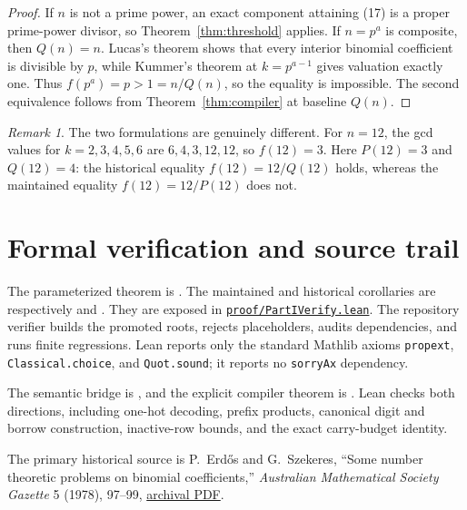 \documentclass[11pt]{article}
\theoremstyle{remark}
\newtheorem{remark}[theorem]{Remark}
\begin{document}
\begin{proof}
If $n$ is not a prime power, an exact component attaining (17) is a proper
prime-power divisor, so Theorem~\ref{thm:threshold} applies.  If
$n=p^a$ is composite, then $Q(n)=n$.  Lucas's theorem shows that every
interior binomial coefficient is divisible by $p$, while Kummer's theorem at
$k=p^{a-1}$ gives valuation exactly one.  Thus $f(p^a)=p>1=n/Q(n)$, so the
equality is impossible.  The second equivalence follows from
Theorem~\ref{thm:compiler} at baseline $Q(n)$.
\end{proof}

\begin{remark}
The two formulations are genuinely different.  For $n=12$, the gcd values
for $k=2,3,4,5,6$ are $6,4,3,12,12$, so $f(12)=3$.  Here
$P(12)=3$ and $Q(12)=4$: the historical equality $f(12)=12/Q(12)$ holds,
whereas the maintained equality $f(12)=12/P(12)$ does not.
\end{remark}


\section{Formal verification and source trail}

\begin{flushleft}
The parameterized theorem is
.
The maintained and historical corollaries are respectively
 and
.  They are exposed in
\href{https://github.com/gakonst/nanocodex-erdos700/blob/main/proof/PartIVerify.lean}
{\texttt{proof/PartIVerify.lean}}.  The repository verifier builds the
promoted roots, rejects placeholders, audits dependencies, and runs finite
regressions.  Lean reports only the standard Mathlib axioms
\texttt{propext}, \texttt{Classical.choice}, and \texttt{Quot.sound}; it
reports no \texttt{sorryAx} dependency.

The semantic bridge is
,
and the explicit compiler theorem is
.
Lean checks both directions, including one-hot decoding, prefix products,
canonical digit and borrow construction, inactive-row bounds, and the exact
carry-budget identity.

The primary historical source is P.~Erd\H{o}s and G.~Szekeres,
``Some number theoretic problems on binomial coefficients,''
\emph{Australian Mathematical Society Gazette} 5 (1978), 97--99,
\href{https://www.renyi.hu/~p_erdos/1978-46.pdf}{archival PDF}.
\end{flushleft}
\end{document}
